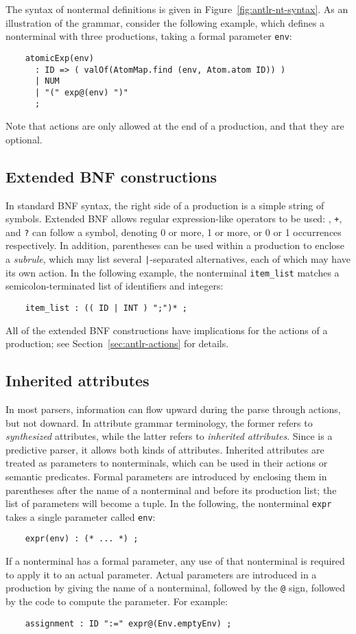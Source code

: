 The syntax of nontermal definitions is given in Figure~\ref{fig:antlr-nt-syntax}.  As an illustration of the grammar, consider the following example, which defines a nonterminal with three productions, taking a formal parameter {\tt env}:
\begin{verbatim}
    atomicExp(env)
      : ID => ( valOf(AtomMap.find (env, Atom.atom ID)) )
      | NUM
      | "(" exp@(env) ")"
      ;
\end{verbatim}
Note that actions are only allowed at the end of a production, and that they are optional.

\subsection{Extended BNF constructions}

In standard BNF syntax, the right side of a production is a simple string of symbols.  Extended BNF allows regular expression-like operators to be used: {\tt *}, {\tt +}, and {\tt ?} can follow a symbol, denoting 0 or more, 1 or more, or 0 or 1 occurrences respectively.  In addition, parentheses can be used within a production to enclose a \emph{subrule}, which may list several {\tt |}-separated alternatives, each of which may have its own action.  In the following example, the nonterminal {\tt item\_list} matches a semicolon-terminated list of identifiers and integers:
\begin{verbatim}
    item_list : (( ID | INT ) ";")* ;
\end{verbatim}
All of the extended BNF constructions have implications for the actions of a production; see Section~\ref{sec:antlr-actions} for details.

\subsection{Inherited attributes}

In most parsers, information can flow upward during the parse through actions, but not downard.  In attribute grammar terminology, the former refers to \emph{synthesized} attributes, while the latter refers to \emph{inherited attributes}.  Since \antlr{} is a predictive parser, it allows both kinds of attributes.  Inherited attributes are treated as parameters to nonterminals, which can be used in their actions or semantic predicates.  Formal parameters are introduced by enclosing them in parentheses after the name of a nonterminal and before its production list; the list of parameters will become a tuple.  In the following, the nonterminal {\tt expr} takes a single parameter called {\tt env}:
\begin{verbatim}
    expr(env) : (* ... *) ;
\end{verbatim}
If a nonterminal has a formal parameter, any use of that nonterminal is required to apply it to an actual parameter.  Actual parameters are introduced in a production by giving the name of a nonterminal, followed by the {\tt @} sign, followed by the code to compute the parameter.  For example:
\begin{verbatim}
    assignment : ID ":=" expr@(Env.emptyEnv) ;
\end{verbatim}

